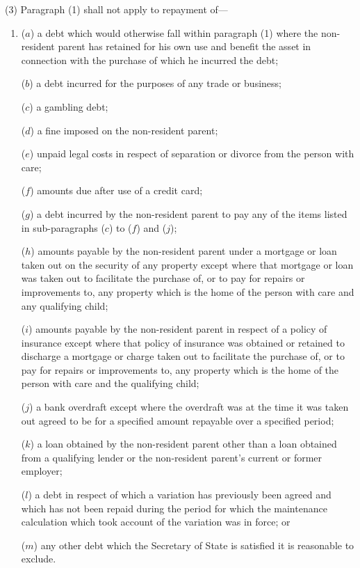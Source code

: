 \documentclass[12pt,a4paper]{article}
\begin{document}
(3) Paragraph (1) shall not apply to repayment of—
\begin{enumerate}\item[]
($a$) a debt which would otherwise fall within paragraph (1) where the non-resident parent has retained for his own use and benefit the asset in connection with the purchase of which he incurred the debt;

($b$) a debt incurred for the purposes of any trade or business;

($c$) a gambling debt;

($d$) a fine imposed on the non-resident parent;

($e$) unpaid legal costs in respect of separation or divorce from the person with care;

($f$) amounts due after use of a credit card;

($g$) a debt incurred by the non-resident parent to pay any of the items listed in sub-paragraphs ($c$)  to ($f$)  and ($j$);

($h$) amounts payable by the non-resident parent under a mortgage or loan taken out on the security of any property except where that mortgage or loan was taken out to facilitate the purchase of, or to pay for repairs or improvements to, any property which is the home of the person with care and any qualifying child;

($i$) amounts payable by the non-resident parent in respect of a policy of insurance except where that policy of insurance was obtained or retained to discharge a mortgage or charge taken out to facilitate the purchase of, or to pay for repairs or improvements to, any property which is the home of the person with care and the qualifying child;

($j$) a bank overdraft except where the overdraft was at the time it was taken out agreed to be for a specified amount repayable over a specified period;

($k$) a loan obtained by the non-resident parent other than a loan obtained from a qualifying lender or the non-resident parent’s current or former employer;

($l$) a debt in respect of which a variation has previously been agreed and which has not been repaid during the period for which the maintenance calculation which took account of the variation was in force; or

($m$) any other debt which the Secretary of State is satisfied it is reasonable to exclude.
\end{enumerate}
\end{document}
